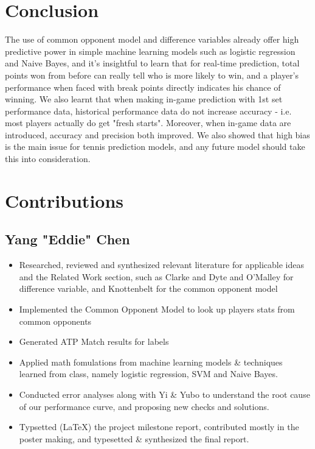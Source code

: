 \documentclass[paper=a4, fontsize=10pt]{scrartcl} %
\numberwithin{equation}{section} %
\numberwithin{figure}{section} %
\numberwithin{table}{section} %
\begin{document}
\section{Conclusion}
The use of common opponent model and difference variables already offer high predictive power in simple machine learning models such as logistic regression and Naive Bayes, and it's insightful to learn that for real-time prediction, total points won from before can really tell who is more likely to win, and a player's performance when faced with break points directly indicates his chance of winning. We also learnt that when making in-game prediction with 1st set performance data, historical performance data do not increase accuracy - i.e. most players actually do get "fresh starts".  Moreover, when in-game data are introduced, accuracy and precision both improved. We also showed that high bias is the main issue for tennis prediction models, and any future model should take this into consideration. 

\section{Contributions}
\subsection{Yang "Eddie" Chen}
\begin{itemize}
\item Researched, reviewed and synthesized relevant literature for applicable ideas and the Related Work section, such as Clarke and Dyte \cite{Clarke2010} and O'Malley \cite{omalley} for difference variable, and Knottenbelt \cite{KNOTTENBELT20123820} for the common opponent model
\item Implemented the Common Opponent Model to look up players stats from common opponents
\item Generated ATP Match results for labels
\item Applied math fomulations from machine learning models \& techniques learned from class, namely logistic regression, SVM and Naive Bayes. 
\item Conducted error analyses along with Yi \& Yubo to understand the root cause of our performance curve, and proposing new checks and solutions. 
\item Typsetted (\LaTeX) the project milestone report, contributed mostly in the poster making, and typesetted \& synthesized the final report. 
\end{itemize}
\end{document}
